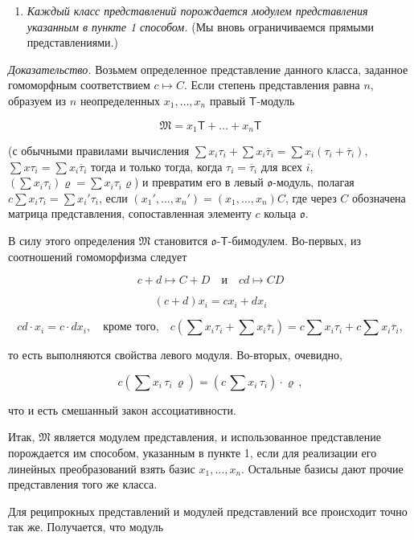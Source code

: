 \documentclass[11pt]{article}
\providecommand{\tightlist}{\setlength{\itemsep}{0pt}\setlength{\parskip}{0pt}}
\begin{document}
\begin{enumerate}
\def\labelenumi{\arabic{enumi}.}
\setcounter{enumi}{1}
\tightlist
\item
  \emph{Каждый класс представлений порождается модулем представления указанным в пункте 1 способом.} (Мы вновь ограничиваемся прямыми представлениями.)
\end{enumerate}

\emph{Доказательство.} Возьмем определенное представление данного класса, заданное гомоморфным соответствием \(c\mapsto C\). Если степень представления равна \(n\), образуем из \(n\) неопределенных \(x_1,\ldots,x_n\) правый \(\mathsf T\)-модуль

\[\mathfrak{M} = x_1 \mathsf{T} + \dots + x_n \mathsf{T}\]

(с обычными правилами вычисления \(\sum x_i\tau_i+\sum x_i\overline{\tau}_i=\sum x_i(\tau_i+\overline{\tau}_i)\), \(\sum x\tau_i=\sum x_i\overline{\tau}_i\) тогда и только тогда, когда \(\tau_i=\overline{\tau}_i\) для всех \(i\), \((\sum x_i\tau_i)\varrho=\sum x_i\tau_i\varrho\)) и превратим его в левый \(\mathfrak{o}\)-модуль, полагая \(c\sum x_i\tau_i=\sum x_i'\tau_i\), если \((x_1',\ldots,x_n')=(x_1,\ldots,x_n)C\), где через \(C\) обозначена матрица представления, сопоставленная элементу \(c\) кольца \(\mathfrak{o}\).

В силу этого определения \(\mathfrak M\) становится \(\mathfrak{o}\)-\(\mathsf T\)-бимодулем. Во-первых, из соотношений гомоморфизма следует

\[
c+d\mapsto C+D \quad \text{и} \quad cd\mapsto CD
\]

\[
(c+d)x_i=cx_i+dx_i
\]

\[
cd\cdot x_i=c\cdot dx_i,\quad\text{кроме того,}\quad
c\left(\sum x_i\tau_i+\sum x_i\overline{\tau}_i\right)
=c\sum x_i\tau_i+c\sum x_i\overline{\tau}_i,
\]

то есть выполняются свойства левого модуля. Во-вторых, очевидно,

\[c(\sum x_i \, \tau_i \, \varrho) = (c \, \sum x_i \, \tau_i) \cdot \varrho \,,\]

что и есть смешанный закон ассоциативности.

Итак, \(\mathfrak{M}\) является модулем представления, и использованное представление порождается им способом, указанным в пункте 1, если для реализации его линейных преобразований взять базис \(x_1, \ldots, x_n\). Остальные базисы дают прочие представления того же класса.

Для реципрокных представлений и модулей представлений все происходит точно так же. Получается, что модуль
\end{document}
